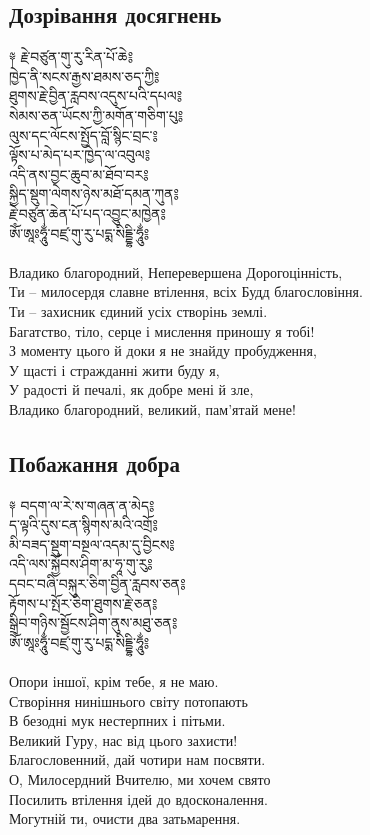 \subsection{Дозрівання досягнень}
\vspace{0.5cm}
\ti
༈ རྗེ་བཙུན་གུ་རུ་རིན་པོ་ཆེ༔ \\
ཁྱེད་ནི་སངས་རྒྱས་ཐམས་ཅད་ཀྱི༔ \\
ཐུགས་རྗེ་བྱིན་རླབས་འདུས་པའི་དཔལ༔ \\
སེམས་ཅན་ཡོངས་ཀྱི་མགོན་གཅིག་པུ༔ \\
ལུས་དང་ལོངས་སྤྱོད་བློ་སྙིང་བྲང་༔ \\
ལྟོས་པ་མེད་པར་ཁྱེད་ལ་འབུལ༔ \\
འདི་ནས་བྱང་ཆུབ་མ་ཐོབ་བར༔\\
སྐྱིད་སྡུག་ལེགས་ཉེས་མཐོ་དམན་ཀུན༔\\
རྗེ་བཙུན་ཆེན་པོ་པད་འབྱུང་མཁྱེན༔\\
ཨོཾ་ཨཱཿཧཱུྂ་བཛྲ་གུ་རུ་པདྨ་སིདྡྷི་ཧཱུྂ༔\\
\\
\ru
Владико благородний, Неперевершена Дорогоцінність,\\
Ти -- милосердя славне втілення, всіх Будд благословіння.\\
Ти -- захисник єдиний усіх створінь землі.\\
Багатство, тіло, серце і мислення приношу я тобі!\\
З моменту цього й доки я не знайду пробудження,\\
У щасті і стражданні жити буду я,\\
У радості й печалі, як добре мені й зле,\\
Владико благородний, великий, пам'ятай мене!\\
\newpage
\subsection{Побажання добра}
\vspace{0.5cm}
\ti
༈ བདག་ལ་རེ་ས་གཞན་ན་མེད༔\\
ད་ལྟའི་དུས་ངན་སྙིགས་མའི་འགྲོ༔\\
མི་བཟད་སྡུག་བསྔལ་འདམ་དུ་བྱིངས༔\\
འདི་ལས་སྐྱོབས་ཤིག་མ་ཧཱ་གུ་རུ༔\\
དབང་བཞི་བསྐུར་ཅིག་བྱིན་རླབས་ཅན༔\\
རྟོགས་པ་སྤོར་ཅིག་ཐུགས་རྗེ་ཅན༔\\
སྒྲིབ་གཉིས་སྦྱོངས་ཤིག་ནུས་མཐུ་ཅན༔\\
ཨོཾ་ཨཱཿཧཱུྂ་བཛྲ་གུ་རུ་པདྨ་སིདྡྷི་ཧཱུྂ༔\\
\\
\ru
Опори іншої, крім тебе, я не маю.\\
Створіння нинішнього світу потопають\\
В безодні мук нестерпних і пітьми.\\
Великий Гуру, нас від цього захисти!\\
Благословенний, дай чотири нам посвяти.\\
О, Милосердний Вчителю, ми хочем свято\\
Посилить втілення ідей до вдосконалення.\\
Могутній ти, очисти два затьмарення.\\

